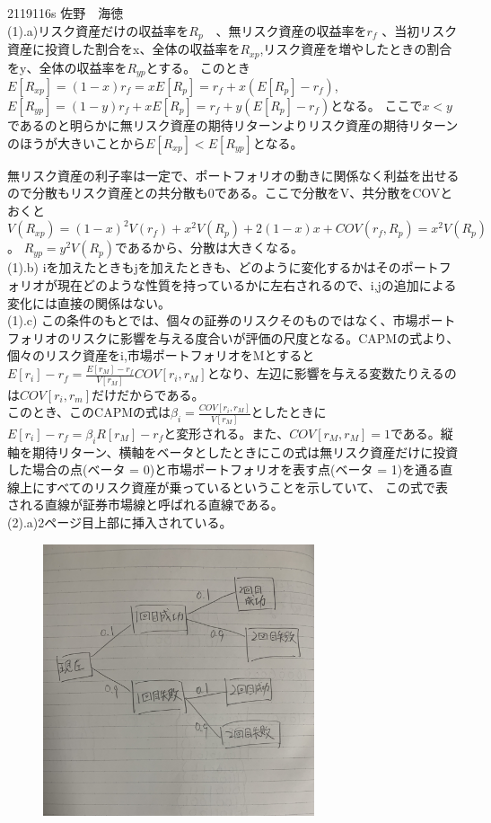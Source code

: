 \documentclass[11pt]{article}
\begin{document}
    2119116s 佐野　海徳\\
(1).a)リスク資産だけの収益率を$R_p$　、無リスク資産の収益率を$r_f$ 、当初リスク資産に投資した割合をx、全体の収益率を$R_{xp}$,リスク資産を増やしたときの割合をy、全体の収益率を$R_{yp}$とする。
このとき$ E[R_{xp}] = (1 - x)r_f = xE[R_p] = r_f + x(E[R_p] - r_f)$, $E[R_{yp}] = (1 - y)r_f + xE[R_p] = r_f + y(E[R_p] - r_f)$となる。
ここで$x < y$であるのと明らかに無リスク資産の期待リターンよりリスク資産の期待リターンのほうが大きいことから$E[R_{xp}] < E[R_{yp}]$となる。
\par 無リスク資産の利子率は一定で、ポートフォリオの動きに関係なく利益を出せるので分散もリスク資産との共分散も0である。ここで分散をV、共分散をCOVとおくと $V(R_{xp}) = (1 - x)^2 V(r_f) + x^2 V(R_p) + 2(1 - x)x + COV(r_f,R_p) = x^2 V(R_p)$。
$R_{yp} = y^2 V(R_p)$であるから、分散は大きくなる。\\
(1).b) iを加えたときもjを加えたときも、どのように変化するかはそのポートフォリオが現在どのような性質を持っているかに左右されるので、i,jの追加による変化には直接の関係はない。\\
(1).c) この条件のもとでは、個々の証券のリスクそのものではなく、市場ポートフォリオのリスクに影響を与える度合いが評価の尺度となる。CAPMの式より、個々のリスク資産をi,市場ポートフォリオをMとすると$E[r_i] - r_f = \frac{E[r_M] - r_f}{V[r_M]}COV[r_i,r_M]$となり、左辺に影響を与える変数たりえるのは$COV[r_i,r_m]$だけだからである。\\
このとき、このCAPMの式は${\beta}_i = \frac{COV[r_i,r_M]}{V[r_M]}$としたときに$E[r_i] - r_f = {\beta}_i{R[r_M] - r_f}$と変形される。また、$COV[r_M,r_M] = 1$である。縦軸を期待リターン、横軸をベータとしたときにこの式は無リスク資産だけに投資した場合の点(ベータ = 0)と市場ポートフォリオを表す点(ベータ = 1)を通る直線上にすべてのリスク資産が乗っているということを示していて、
この式で表される直線が証券市場線と呼ばれる直線である。\\
(2).a)2ページ目上部に挿入されている。\begin{figure}[ht]
\includegraphics[height = 8cm,width= 80mm,angle = -90]{IMG_2214.JPG}
\end{figure}
\end{document}
